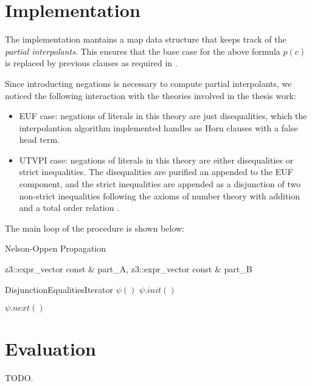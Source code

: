 \section{Implementation}

The implementation mantains a map data structure that 
keeps track of the \emph{partial interpolants}. This ensures
that the base case for the above formula $p(c)$ is replaced
by previous clauses as required in \cite{10.1007/11532231_26}.

Since introducting negations is necessary to compute partial interpolants,
we noticed the following interaction with the theories involved in the
thesis work:

\begin{itemize}
  \item EUF case: negations of literals in this theory are just
    disequalities, which the interpolantion algorithm implemented
    handles as Horn clauses with a false head term.
  \item UTVPI case: negations of literals in this theory are either
    disequalities or strict inequalities. The disequalities are purified
    an appended to the EUF component, and the strict inequalities are 
    appended as a disjunction of two non-strict inequalities following
    the axioms of number theory with addition and a total order relation
    \cite{DBLP:books/daglib/0076838}.
\end{itemize}

The main loop of the procedure is shown below:

\begin{algorithm}
  \caption{ Nelson-Oppen Propagation }
  \linespread{\separationline}\selectfont
  \begin{algorithmic}[2]
     { 
      z3::expr\_vector const \& part\_A, 
      z3::expr\_vector const \& part\_B 
  }


    \State DisjunctionEqualitiesIterator $\psi()$
    \State $\psi.init()$

    \EndIf
    \EndIf


    \Else
    \EndIf

    \Else

    \Else
    \EndIf

    \EndIf

    \State $\psi.next()$

    \EndWhile

    \EndProcedure
  \end{algorithmic}
\end{algorithm}

\section{Evaluation}
TODO.

